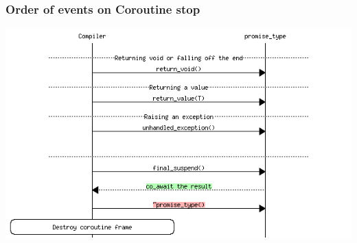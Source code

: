 \documentclass[aspectratio=169]{beamer}
\begin{document}
\begin{frame}
  \frametitle{Order of events on Coroutine stop}

  \includegraphics[height=.9\textheight]{corogfx/stop_flow.png}
\end{frame}

\end{document}
